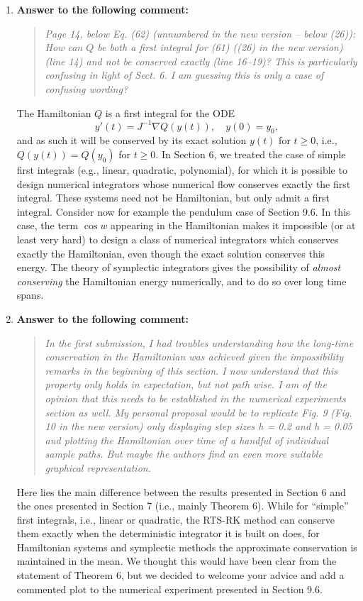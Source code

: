 \documentclass[10pt]{article}
\begin{document}
\begin{enumerate}
\item \textbf{Answer to the following comment:}
\begin{quote} \textit{Page 14, below Eq. (62) (unnumbered in the new version -- below (26)): How can $Q$ be both a first integral for (61) ((26) in the new version) (line 14) and not be conserved exactly (line 16–19)? This is particularly confusing in light of Sect. 6. I am guessing this is only a case of confusing wording?} \end{quote}
The Hamiltonian $Q$ is a first integral for the ODE
\begin{equation*}
	y'(t) = J^{-1} \nabla Q(y(t)), \quad y(0) = y_0,
\end{equation*}
and as such it will be conserved by its exact solution $y(t)$ for $t \geq 0$, i.e., $Q(y(t)) = Q(y_0)$ for $t \geq 0$. In Section 6, we treated the case of simple first integrals (e.g., linear, quadratic, polynomial), for which it is possible to design numerical integrators whose numerical flow conserves exactly the first integral. These systems need not be Hamiltonian, but only admit a first integral. Consider now for example the pendulum case of Section 9.6. In this case, the term $\cos w$ appearing in the Hamiltonian makes it impossible (or at least very hard) to design a class of numerical integrators which conserves exactly the Hamiltonian, even though the exact solution conserves this energy. The theory of symplectic integrators gives the possibility of \textit{almost conserving} the Hamiltonian energy numerically, and to do so over long time spans. 

\item \textbf{Answer to the following comment:}
\begin{quote} \textit{In the first submission, I had troubles understanding how the long-time conservation in the Hamiltonian was achieved given the impossibility remarks in the beginning of this section. I now understand that this property only holds in expectation, but not path wise. I am of the opinion that this	needs to be established in the numerical experiments section as well. My personal proposal would be to replicate Fig. 9 (Fig. 10 in the new version) only displaying step sizes h = 0.2 and h = 0.05 and plotting the Hamiltonian over time of a handful of individual sample paths. But maybe the authors find an even more suitable graphical representation.} \end{quote}
Here lies the main difference between the results presented in Section 6 and the ones presented in Section 7 (i.e., mainly Theorem 6). While for ``simple'' first integrals, i.e., linear or quadratic, the RTS-RK method can conserve them exactly when the deterministic integrator it is built on does, for Hamiltonian systems and symplectic methods the approximate conservation is maintained in the mean. We thought this would have been clear from the statement of Theorem 6, but we decided to welcome your advice and add a commented plot to the numerical experiment presented in Section 9.6. 


\end{enumerate}
\end{document}
